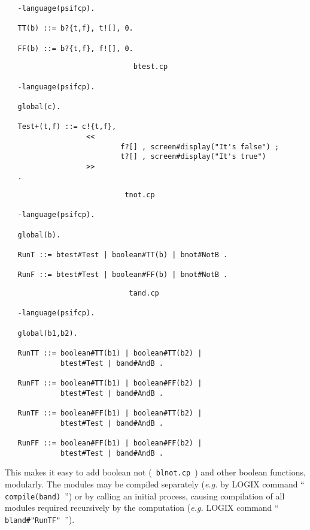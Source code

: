 \begin{verbatim}
   -language(psifcp).

   TT(b) ::= b?{t,f}, t![], 0.

   FF(b) ::= b?{t,f}, f![], 0.
\end{verbatim}

{\samepage
\begin{verbatim}
                              btest.cp

   -language(psifcp).

   global(c).

   Test+(t,f) ::= c!{t,f},
                   <<
                           f?[] , screen#display("It's false") ;
                           t?[] , screen#display("It's true")
                   >>
   .
\end{verbatim}
}

{\samepage
\begin{verbatim}
                            tnot.cp

   -language(psifcp).

   global(b).

   RunT ::= btest#Test | boolean#TT(b) | bnot#NotB .

   RunF ::= btest#Test | boolean#FF(b) | bnot#NotB .
\end{verbatim}
}

\begin{verbatim}
                             tand.cp

   -language(psifcp).

   global(b1,b2).

   RunTT ::= boolean#TT(b1) | boolean#TT(b2) |
             btest#Test | band#AndB .

   RunFT ::= boolean#TT(b1) | boolean#FF(b2) |
             btest#Test | band#AndB .

   RunTF ::= boolean#FF(b1) | boolean#TT(b2) |
             btest#Test | band#AndB .

   RunFF ::= boolean#FF(b1) | boolean#FF(b2) |
             btest#Test | band#AndB .
\end{verbatim}

\noindent
This makes it easy to add boolean not (\verb+ blnot.cp +) and other
boolean functions, modularly.  The modules may be compiled separately
({\em e.g.} by LOGIX command ``\verb+ compile(band) +'') or by calling
an initial process, causing compilation of all modules required
recursively by the computation 
({\em e.g.} LOGIX command ``\verb+ bland#"RunTF" +'').

